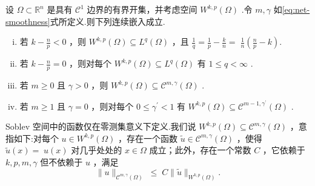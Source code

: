 \begin{theorem}[一般 Soblev 嵌入]\label{thm:sobolev-embedding-general}
设 $\Omega  \subset  {\mathbb{R}}^{n}$ 是具有 ${\mathcal{C}}^{1}$ 边界的有界开集，并考虑空间 ${W}^{k,p}\left( \Omega \right)$ .令 $m,\gamma$ 如\eqref{eq:net-smoothness}式所定义.则下列连续嵌入成立.
\begin{enumerate}[(i)]
    \item 若 $k - \frac{n}{p} < 0$ ，则 ${W}^{k,p}\left( \Omega \right)  \subseteq  {L}^{q}\left( \Omega \right)$ ，且 $\frac{1}{q} = \frac{1}{p} - \frac{k}{n} = \; \frac{1}{n}\left( {\frac{n}{p} - k}\right) .$
    \item 若 $k - \frac{n}{p} = 0$ ，则对每个 ${W}^{k,p}\left( \Omega \right)  \subseteq  {L}^{q}\left( \Omega \right)$ 有 $1 \leq  q < \infty$ .
    \item 若 $m \geq  0$ 且 $\gamma  > 0$ ，则 ${W}^{k,p}\left( \Omega \right)  \subseteq  {\mathcal{C}}^{m,\gamma }\left( \Omega \right)$ .
    \item 若 $m \geq  1$ 且 $\gamma  = 0$ ，则对每个 $0 \leq  {\gamma }^{\prime } < 1$ 有 ${W}^{k,p}\left( \Omega \right)  \subseteq  {\mathcal{C}}^{m - 1,{\gamma }^{\prime }}\left( \Omega \right)$ .
\end{enumerate}
\end{theorem}

\begin{remark}\label{rem:sobolev-embedding-meaning}
Soblev 空间中的函数仅在零测集意义下定义.我们说 ${W}^{k,p}\left( \Omega \right)  \subseteq  {\mathcal{C}}^{m,\gamma }\left( \Omega \right)$ ，意指如下:对每个 $u \in  {W}^{k,p}\left( \Omega \right)$ ，存在一个函数 $\widetilde{u} \in  {\mathcal{C}}^{m,\gamma }\left( \Omega \right)$ ，使得 $\widetilde{u}\left( x\right)  = \; u\left( x\right)$ 对几乎处处的 $x \in  \Omega$ 成立；此外，存在一个常数 $C$ ，它依赖于 $k,p,m,\gamma$ 但不依赖于 $u$ ，满足
\[
\| u{\| }_{{\mathcal{C}}^{m,\gamma }\left( \Omega \right) }\; \leq  \;C\| \widetilde{u}{\| }_{{W}^{k,p}\left( \Omega \right) }.
\]
\end{remark}

